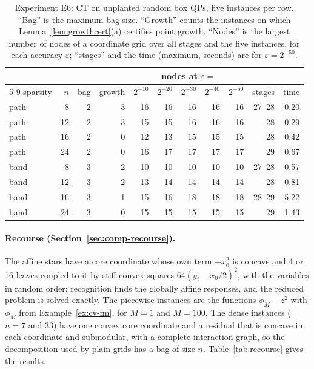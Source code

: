 \begin{table}[t]
\centering\small
\caption{Experiment E6: CT on unplanted random box QPs, five instances per
row. ``Bag'' is the maximum bag size. ``Growth'' counts the instances on which
Lemma~\ref{lem:growthcert}(a) certifies point growth. ``Nodes'' is the largest
number of nodes of a coordinate grid over all stages and the five instances,
for each accuracy $\varepsilon$; ``stages'' and the time (maximum, seconds)
are for $\varepsilon=2^{-50}$.}\label{tab:random}
\begin{tabular}{lrrrrrrrrrr}
\toprule
&&&&\multicolumn{5}{c}{nodes at $\varepsilon=$}&&\\
\cmidrule(lr){5-9}
sparsity & $n$ & bag & growth & $2^{-10}$ & $2^{-20}$ & $2^{-30}$ & $2^{-40}$ & $2^{-50}$ & stages & time\\
\midrule
path & 8 & 2 & 3 & 16 & 16 & 16 & 16 & 16 & 27--28 & 0.20\\
path & 12 & 2 & 3 & 15 & 15 & 16 & 16 & 16 & 28 & 0.29\\
path & 16 & 2 & 0 & 12 & 13 & 15 & 15 & 15 & 28 & 0.42\\
path & 24 & 2 & 0 & 16 & 17 & 17 & 17 & 17 & 29 & 0.67\\
band & 8 & 3 & 2 & 10 & 10 & 10 & 10 & 10 & 27--28 & 0.57\\
band & 12 & 3 & 2 & 13 & 14 & 14 & 14 & 14 & 28 & 0.81\\
band & 16 & 3 & 1 & 15 & 16 & 18 & 18 & 18 & 28--29 & 5.22\\
band & 24 & 3 & 0 & 15 & 15 & 15 & 15 & 15 & 29 & 1.43\\
\bottomrule
\end{tabular}
\end{table}

\paragraph{Recourse (Section~\ref{sec:comp-recourse}).}
The affine stars have a core coordinate whose own term $-x_0^2$ is concave and
4 or 16 leaves coupled to it by stiff convex squares $64(y_i-x_0/2)^2$, with
the variables in random order; recognition finds the globally affine
responses, and the reduced problem is solved exactly. The piecewise instances
are the functions $\phi_M-z^2$ with $\phi_M$ from Example~\ref{ex:cv-fm}, for
$M=1$ and $M=100$. The dense instances ($n=7$ and $33$) have one convex core
coordinate and a residual that is concave in each coordinate and submodular,
with a complete interaction graph, so the decomposition used by plain grids
has a bag of size $n$. Table~\ref{tab:recourse} gives the results.

